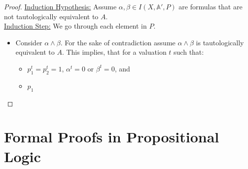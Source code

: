 \documentclass[12pt]{article}
\begin{document}
\begin{enumerate}
\begin{tasks}
\begin{proof}
            \underline{Induction Hypothesis:} Assume $\alpha,\beta\in I(X,\mathbb{A}', P)$ are formulas that are not tautologically equivalent to $A$.\\
            \underline{Induction Step:} We go through each element in $P$.
            \begin{itemize}
                \item Consider $\alpha\land\beta$. For the sake of contradiction assume $\alpha\land\beta$ is tautologically equivalent to $A$. This implies, that for a valuation $t$ such that:
                \begin{itemize}
                    \item $p_1^t=p_2^t=1$, $\alpha^t=0$ or $\beta^t=0$, and
                    \item $p_1$
                \end{itemize}
            \end{itemize}
        \end{proof}
    \end{tasks}
\end{enumerate}

\section{Formal Proofs in Propositional Logic}
\end{document}
